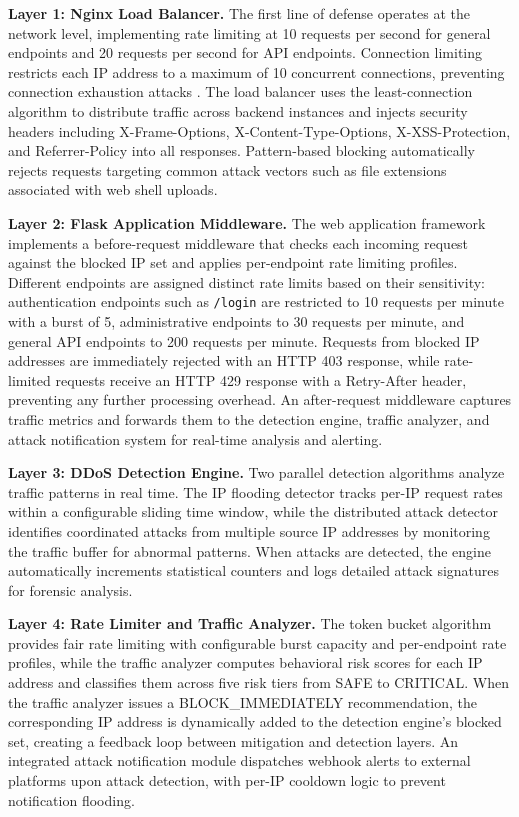 \documentclass[conference]{IEEEtran}
\begin{document}
\textbf{Layer 1: Nginx Load Balancer.} The first line of defense operates at the network level, implementing rate limiting at 10 requests per second for general endpoints and 20 requests per second for API endpoints. Connection limiting restricts each IP address to a maximum of 10 concurrent connections, preventing connection exhaustion attacks \cite{b7}. The load balancer uses the least-connection algorithm to distribute traffic across backend instances and injects security headers including X-Frame-Options, X-Content-Type-Options, X-XSS-Protection, and Referrer-Policy into all responses. Pattern-based blocking automatically rejects requests targeting common attack vectors such as file extensions associated with web shell uploads.

\textbf{Layer 2: Flask Application Middleware.} The web application framework implements a before-request middleware that checks each incoming request against the blocked IP set and applies per-endpoint rate limiting profiles. Different endpoints are assigned distinct rate limits based on their sensitivity: authentication endpoints such as \texttt{/login} are restricted to 10 requests per minute with a burst of 5, administrative endpoints to 30 requests per minute, and general API endpoints to 200 requests per minute. Requests from blocked IP addresses are immediately rejected with an HTTP 403 response, while rate-limited requests receive an HTTP 429 response with a Retry-After header, preventing any further processing overhead. An after-request middleware captures traffic metrics and forwards them to the detection engine, traffic analyzer, and attack notification system for real-time analysis and alerting.

\textbf{Layer 3: DDoS Detection Engine.} Two parallel detection algorithms analyze traffic patterns in real time. The IP flooding detector tracks per-IP request rates within a configurable sliding time window, while the distributed attack detector identifies coordinated attacks from multiple source IP addresses by monitoring the traffic buffer for abnormal patterns. When attacks are detected, the engine automatically increments statistical counters and logs detailed attack signatures for forensic analysis.

\textbf{Layer 4: Rate Limiter and Traffic Analyzer.} The token bucket algorithm provides fair rate limiting with configurable burst capacity and per-endpoint rate profiles, while the traffic analyzer computes behavioral risk scores for each IP address and classifies them across five risk tiers from SAFE to CRITICAL. When the traffic analyzer issues a BLOCK\_IMMEDIATELY recommendation, the corresponding IP address is dynamically added to the detection engine's blocked set, creating a feedback loop between mitigation and detection layers. An integrated attack notification module dispatches webhook alerts to external platforms upon attack detection, with per-IP cooldown logic to prevent notification flooding.
\end{document}
